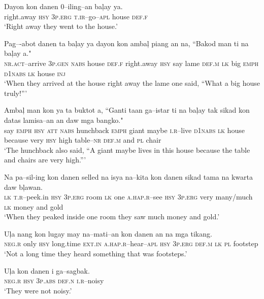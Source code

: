 \ea
\gll  Dayon  kon  danen  0--iling--an  ba\c{l}ay  ya. \\
right.away  \textsc{hsy}  3\textsc{p.erg}  \textsc{t.ir}--go--\textsc{apl}  house  \textsc{def.f} \\
\glt ‘Right away they went to the house.’
\z

\ea
\gll  Pag--{}-abot  danen  ta  ba\c{l}ay  ya  dayon  kon  amba\c{l}  piang  an   na,  ``Bakod  man  ti  na  ba\c{l}ay  a." \\
\textsc{nr.act}--arrive  3\textsc{p.gen}  \textsc{nabs}  house  \textsc{def.f}  right.away  \textsc{hsy}  say  lame  \textsc{def.m}
\textsc{lk}  big  \textsc{emph}  \textsc{d1nabs}  \textsc{lk}  house  \textsc{inj} \\
\glt ‘When they arrived at the house right away the lame one said, “What a big house truly!”’
\z

\ea
\gll Amba\c{l}  man  kon  ya  ta  buktot  a,  ``Ganti   taan  ga--istar  ti  na  ba\c{l}ay  tak  sikad  kon   datas  lamisa--an  an  daw  mga  bangko." \\
say  \textsc{emph}  \textsc{hsy}  \textsc{att}  \textsc{nabs}  hunchback  \textsc{emph}  giant
maybe  \textsc{i.r}--live  \textsc{d1nabs}  \textsc{lk}  house  because  very  \textsc{hsy}
high  table--\textsc{nr}  \textsc{def.m}  and  \textsc{pl}  chair \\
\glt ‘The hunchback also said, “A giant maybe lives in this house because the table and chairs are very high.”’
\z

\ea
\gll  Na  pa--sil-ing  kon  danen  selled  na  isya  na--kita  kon danen  sikad  tama  na  kwarta  daw  b\c{l}awan. \\
\textsc{lk}  \textsc{t.r}--peek.in  \textsc{hsy}  3\textsc{p.erg}  room  \textsc{lk}  one  \textsc{a.hap.r}--see  \textsc{hsy}
3\textsc{p.erg}  very  many/much  \textsc{lk}  money  and  gold \\
\glt ‘When they peaked inside one room they saw much money and gold.’
\z

\ea
\gll  U\c{l}a  nang  kon  lugay  may  na--mati--an  kon  danen  an   na  mga  tikang. \\
\textsc{neg.r}  only  \textsc{hsy}  long.time  \textsc{ext.in}  \textsc{a.hap.r}--hear--\textsc{apl}  \textsc{hsy}  3\textsc{p.erg}  \textsc{def.m}
\textsc{lk}  \textsc{pl}  footstep \\
\glt ‘Not a long time they heard something that was footsteps.’
\z

\ea
\gll  U\c{l}a  kon  danen  i  ga--sagbak. \\
\textsc{neg.r}  \textsc{hsy}  3\textsc{p.abs}  \textsc{def.n}  \textsc{i.r}--noisy \\
\glt ‘They were not noisy.’
\z

